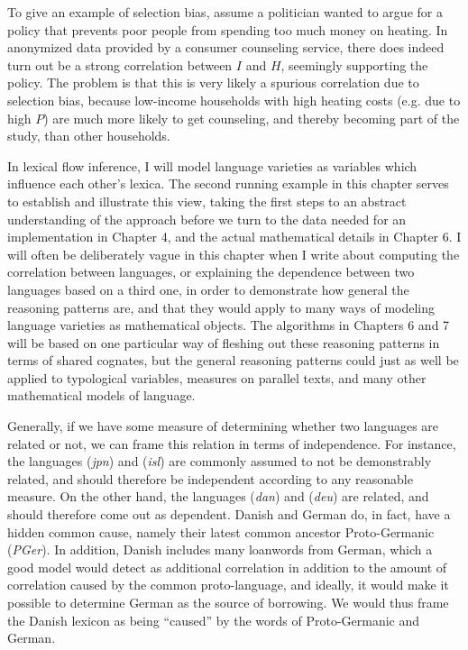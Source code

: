 To give an example of selection bias, assume a politician wanted to argue for a policy that prevents poor people from spending too much money on heating. In anonymized data provided by a consumer counseling service, there does indeed turn out be a strong correlation between $I$ and $H$, seemingly supporting the policy. The problem is that this is very likely a spurious correlation due to selection bias, because low-income households with high heating costs (e.g. due to high $P$) are much more likely to get counseling, and thereby becoming part of the study, than other households.

In lexical flow inference, I will model language varieties as variables which influence each other's lexica. The second running example in this chapter serves to establish and illustrate this view, taking the first steps to an abstract understanding of the approach before we turn to the data needed for an implementation in Chapter 4, and the actual mathematical details in Chapter 6. I will often be deliberately vague in this chapter when I write about computing the correlation between languages, or explaining the dependence between two languages based on a third one, in order to demonstrate how general the reasoning patterns are, and that they would apply to many ways of modeling language varieties as mathematical objects. The algorithms in Chapters 6 and 7 will be based on one particular way of fleshing out these reasoning patterns in terms of shared cognates, but the general reasoning patterns could just as well be applied to typological variables, measures on parallel texts, and many other mathematical 
models of language.

Generally, if we have some measure of determining whether two languages are related or not, we can frame this relation in terms of independence. For instance, the languages  (\textit{jpn}) and  (\textit{isl}) are commonly assumed to not be demonstrably related, and should therefore be independent according to any reasonable measure. On the other hand, the languages  (\textit{dan}) and  (\textit{deu}) are related, and should therefore come out as dependent. Danish and German do, in fact, have a hidden common cause, namely their latest common ancestor Proto-Germanic (\textit{PGer}). In addition, Danish includes many loanwords from German, which a good model would detect as additional correlation in addition to the amount of correlation caused by the common proto-language, and ideally, it would make it possible to determine German as the source of borrowing. We would thus frame the Danish lexicon as being ``caused'' by the words of Proto-Germanic and German.

